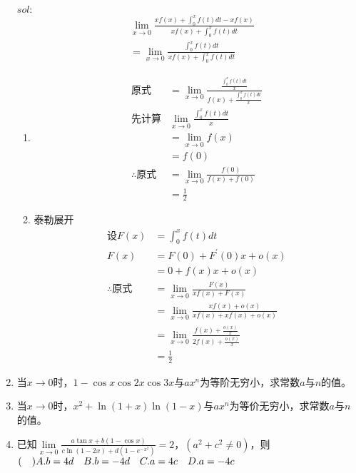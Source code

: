 \begin{enumerate}[{例}1.]
        $sol:$
        \begin{align*}
            &\lim_{x \to 0}\frac{xf(x)+\int_0^x f(t)dt-xf(x)}{xf(x)+\int_0^x f(t)dt}\\
            &=\lim_{x \to 0}\frac{\int_0^x f(t)dt}{xf(x)+\int_0^x f(t)dt}
        \end{align*}
        \begin{enumerate}[$1^\circ$]
            \item 
                \begin{align*}
                    \mbox{原式}&=\lim_{x \to 0}\frac{\frac{\int_0^x f(t)dt}{x}}{f(x)+\frac{\int_0^x f(t) dt}{x}}\\
                    \mbox{先计算}&\lim_{x \to 0}\frac{\int_0^x f(t) dt}{x}\\
                    &=\lim_{x \to 0}f(x)\\
                    &=f(0)\\
                    \therefore\mbox{原式}&=\lim_{x \to 0}\frac{f(0)}{f(x)+f(0)}\\
                    &=\frac{1}{2}
                \end{align*}
            \item 泰勒展开
                \begin{align*}
                    \mbox{设}F(x)&=\int_0^x f(t)dt\\
                    F(x)&=F(0)+F^{\prime}(0)x+o(x)\\
                    &=0+f(x)x+o(x)\\
                    \therefore\mbox{原式}&=\lim_{x \to 0}\frac{F(x)}{xf(x)+F(x)}\\
                    &=\lim_{x \to 0}\frac{xf(x)+o(x)}{xf(x)+xf(x)+o(x)}\\
                    &=\lim_{x \to 0}\frac{f(x)+\frac{o(x)}{x}}{2f(x)+\frac{o(x)}{x}}\\
                    &=\frac{1}{2}
                \end{align*}
        \end{enumerate}
    \item 当$x\to0$时，$1-\cos x\cos 2x\cos 3x$与$ax^n$为等阶无穷小，求常数$a$与$n$的值。
    \item 当$x\to0$时，$x^2+\ln(1+x)\ln(1-x)$与$ax^n$为等价无穷小，求常数$a$与$n$的值。
    \item 已知$\lim\limits_{x\to0}\frac{a\tan x+b(1-\cos x)}{c\ln(1-2x)+d(1-e^{-x^2})}=2$，$(a^2+c^2\neq0)$，则$(\quad)\\ A.b=4d\quad B.b=-4d\quad C.a=4c\quad D.a=-4c$

\end{enumerate}
